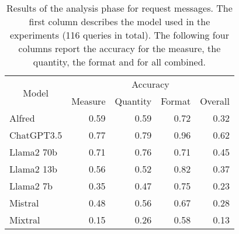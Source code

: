 
\begin{table}[ht]
\centering


\begin{tabular}{|l|rrrr|}
\hline
\multicolumn{1}{|c|}{\multirow{2}{*}{Model}} & \multicolumn{4}{c|}{Accuracy} \\ \cline{2-5} 
\multicolumn{1}{|c|}{} & \multicolumn{1}{l|}{Measure} & \multicolumn{1}{l|}{Quantity} & \multicolumn{1}{l|}{Format} & \multicolumn{1}{l|}{Overall} \\ \hline
\rowcolor[HTML]{EFEFEF}
Alfred & \multicolumn{1}{r|}{0.59} & \multicolumn{1}{r|}{0.59} & \multicolumn{1}{r|}{0.72} & 0.32 \\ \hline
ChatGPT3.5 & \multicolumn{1}{r|}{0.77} & \multicolumn{1}{r|}{0.79} & \multicolumn{1}{r|}{0.96} & 0.62 \\ \hline
\rowcolor[HTML]{EFEFEF}
Llama2 70b & \multicolumn{1}{r|}{0.71} & \multicolumn{1}{r|}{0.76} & \multicolumn{1}{r|}{0.71} & 0.45 \\ \hline
Llama2 13b & \multicolumn{1}{r|}{0.56} & \multicolumn{1}{r|}{0.52} & \multicolumn{1}{r|}{0.82} & 0.37 \\ \hline
\rowcolor[HTML]{EFEFEF}
Llama2 7b & \multicolumn{1}{r|}{0.35} & \multicolumn{1}{r|}{0.47} & \multicolumn{1}{r|}{0.75} & 0.23 \\ \hline
Mistral & \multicolumn{1}{r|}{0.48} & \multicolumn{1}{r|}{0.56} & \multicolumn{1}{r|}{0.67} & 0.28 \\ \hline
\rowcolor[HTML]{EFEFEF}
Mixtral & \multicolumn{1}{r|}{0.15} & \multicolumn{1}{r|}{0.26} & \multicolumn{1}{r|}{0.58} & 0.13 \\ \hline
\end{tabular}

\caption{
    Results of the analysis phase for request messages.
    The first column describes the model used in the experiments (116 queries in total).
    The following four columns report the accuracy for the measure, the quantity, the format and for all combined.
}
\label{tab:req}
\end{table}